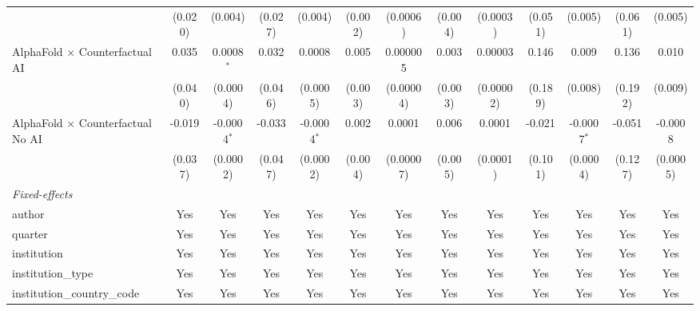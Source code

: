 \begin{tabular}{lcccccccccccc}
                                            & (0.020)       & (0.004)       & (0.027)       & (0.004)       & (0.002) & (0.0006)  & (0.004) & (0.0003)  & (0.051)       & (0.005)       & (0.061)       & (0.005)\\   
   AlphaFold $\times$ Counterfactual AI     & 0.035         & 0.0008$^{*}$  & 0.032         & 0.0008        & 0.005   & 0.000005  & 0.003   & 0.00003   & 0.146         & 0.009         & 0.136         & 0.010\\   
                                            & (0.040)       & (0.0004)      & (0.046)       & (0.0005)      & (0.003) & (0.00004) & (0.003) & (0.00002) & (0.189)       & (0.008)       & (0.192)       & (0.009)\\   
   AlphaFold $\times$ Counterfactual No AI  & -0.019        & -0.0004$^{*}$ & -0.033        & -0.0004$^{*}$ & 0.002   & 0.0001    & 0.006   & 0.0001    & -0.021        & -0.0007$^{*}$ & -0.051        & -0.0008\\   
                                            & (0.037)       & (0.0002)      & (0.047)       & (0.0002)      & (0.004) & (0.00007) & (0.005) & (0.0001)  & (0.101)       & (0.0004)      & (0.127)       & (0.0005)\\   
   \midrule
   \emph{Fixed-effects}\\
   author                                   & Yes           & Yes           & Yes           & Yes           & Yes     & Yes       & Yes     & Yes       & Yes           & Yes           & Yes           & Yes\\  
   quarter                                  & Yes           & Yes           & Yes           & Yes           & Yes     & Yes       & Yes     & Yes       & Yes           & Yes           & Yes           & Yes\\  
   institution                              & Yes           & Yes           & Yes           & Yes           & Yes     & Yes       & Yes     & Yes       & Yes           & Yes           & Yes           & Yes\\  
   institution\_type                        & Yes           & Yes           & Yes           & Yes           & Yes     & Yes       & Yes     & Yes       & Yes           & Yes           & Yes           & Yes\\  
   institution\_country\_code               & Yes           & Yes           & Yes           & Yes           & Yes     & Yes       & Yes     & Yes       & Yes           & Yes           & Yes           & Yes\\  

\end{tabular}
